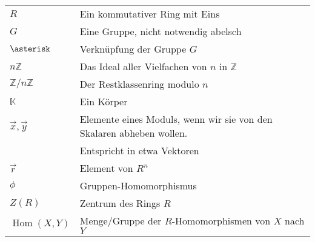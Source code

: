 \documentclass[a4paper]{amsart}
\theoremstyle{definition}
\DeclareMathOperator{\Hom}{Hom}
\newcommand{\Z}{\ensuremath{\mathbb{ Z }}}
\newcommand{\K}{\ensuremath{\mathbb{ K }}}
\newcommand{\zz}[1]{\ensuremath{\Z /#1\Z}}
\begin{document}
\renewcommand*{\arraystretch}{1}

\begin{tabular}{ll}
    $R$                                 & Ein kommutativer Ring mit Eins\\
    $G$                                 & Eine Gruppe, nicht notwendig abelsch\\
    $\asterisk$                         & Verknüpfung der Gruppe $G$\\
    $n\Z$                               & Das Ideal aller Vielfachen von $n$ in $\Z$\\
    $\zz{n}$                            & Der Restklassenring modulo $n$\\
    $\K$                                & Ein Körper\\
    $\vec x, \vec y$                    & Elemente eines Moduls, wenn wir sie von den Skalaren abheben wollen. \\
                                        & Entspricht in etwa Vektoren\\
    $\vec r$                            & Element von $R^n$\\
    $\phi$                              & Gruppen-Homomorphismus\\
    $Z(R)$                              & Zentrum des Rings $R$\\
    $\Hom(X,Y)$                         & Menge/Gruppe der $R$-Homomorphismen von $X$ nach $Y$
    
\end{tabular}
\end{document}

